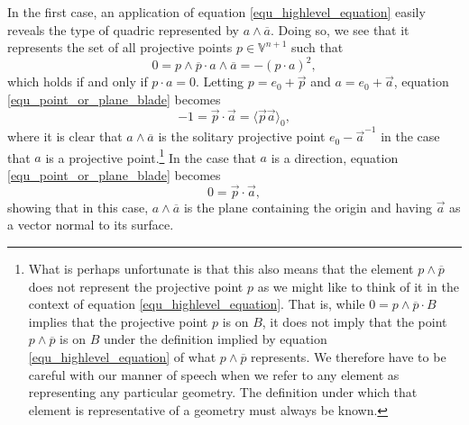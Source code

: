 \documentclass{ecgd-l}
\theoremstyle{definition}
\theoremstyle{remark}
\numberwithin{equation}{section}
\newcommand{\V}{\mathbb{V}}
\begin{document}
In the first case, an application of equation
\eqref{equ_highlevel_equation} easily reveals the type of quadric
represented by $a\wedge\overline{a}$.  Doing so, we see that it represents
the set of all projective points $p\in\V^{n+1}$ such that
\begin{equation}\label{equ_point_or_plane_blade}
0=p\wedge\overline{p}\cdot a\wedge\overline{a}=-(p\cdot a)^2,
\end{equation}
which holds if and only if $p\cdot a=0$.
Letting $p=e_0+\vec{p}$ and $a=e_0+\vec{a}$, equation \eqref{equ_point_or_plane_blade} becomes
\begin{equation}
-1 = \vec{p}\cdot\vec{a} = \langle \vec{p}\vec{a}\rangle_0,
\end{equation}
where it is clear that $a\wedge\overline{a}$ is the solitary projective point
$e_0-\vec{a}^{-1}$ in the case that $a$ is a projective point.\footnote{What is perhaps unfortunate is
that this also means that the element $p\wedge\overline{p}$ does not
represent the projective point $p$ as we might like to think of it
in the context of equation \eqref{equ_highlevel_equation}.
That is, while $0=p\wedge\overline{p}\cdot B$ implies that the
projective point $p$ is on $B$, it does not imply that the point $p\wedge\overline{p}$
is on $B$ under the definition implied by equation \eqref{equ_highlevel_equation}
of what $p\wedge\overline{p}$ represents.  We therefore have to be careful with
our manner of speech when we refer to any element as representing any particular geometry.
The definition under which that element is representative of a geometry must always be known.}
In the case that $a$ is a direction, equation \eqref{equ_point_or_plane_blade} becomes
\begin{equation}
0 = \vec{p}\cdot\vec{a},
\end{equation}
showing that in this case, $a\wedge\overline{a}$ is the plane containing
the origin and having $\vec{a}$ as a vector normal to its surface.

\end{document}
